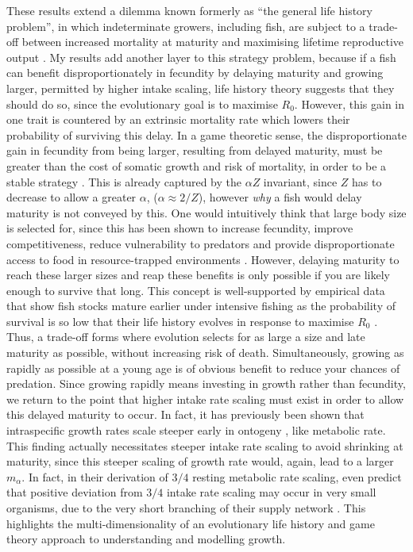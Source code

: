 \documentclass[a4paper]{article} %
\begin{document}
These results extend a dilemma known formerly as ``the general life history problem'', in which indeterminate growers, including fish, are subject to a trade-off between increased mortality at maturity and maximising lifetime reproductive output \autocite{Roff1984, Roff2006, Stearns2000}. My results add another layer to this strategy problem, because if a fish can benefit disproportionately in fecundity by delaying maturity and growing larger, permitted by higher intake scaling, life history theory suggests that they should do so, since the evolutionary goal is to maximise $R_0$. However, this gain in one trait is countered by an extrinsic mortality rate which lowers their probability of surviving this delay. In a game theoretic sense, the disproportionate gain in fecundity from being larger, resulting from delayed maturity, must be greater than the cost of somatic growth and risk of mortality, in order to be a stable strategy \autocite{Arendt2011, Enberg2012}. This is already captured by the $\alpha Z$ invariant, since $Z$ has to decrease to allow a greater $\alpha$, ($\alpha \approx 2/Z$), however \textit{why} a fish would delay maturity is not conveyed by this. One would intuitively think that large body size is selected for, since this has been shown to increase fecundity, improve competitiveness, reduce vulnerability to predators and provide disproportionate access to food in resource-trapped environments \autocite{roff2002life, Oddie2000, French2005, Bashey2008, Magnhagen2001, Craig2006, Arendt2011, Pawar2012}. However, delaying maturity to reach these larger sizes and reap these benefits is only possible if you are likely enough to survive that long. This concept is well-supported by empirical data that show fish stocks mature earlier under intensive fishing as the probability of survival is so low that their life history evolves in response to maximise $R_0$ \autocite{Rowell1993, Rochet2001, Swain2011}. Thus, a trade-off forms where evolution selects for as large a size and late maturity as possible, without increasing risk of death. Simultaneously, growing as rapidly as possible at a young age is of obvious benefit to reduce your chances of predation. Since growing rapidly means investing in growth rather than fecundity, we return to the point that higher intake rate scaling must exist in order to allow this delayed maturity to occur. In fact, it has previously been shown that intraspecific growth rates scale steeper early in ontogeny \autocite{Barneche2018c}, like metabolic rate. This finding actually necessitates steeper intake rate scaling to avoid shrinking at maturity, since this steeper scaling of growth rate would, again, lead to a larger $m_{\alpha}$. In fact, in their derivation of $3/4$ resting metabolic rate scaling, \textcite{West1997} even predict that positive deviation from $3/4$ intake rate scaling may occur in very small organisms, due to the very short branching of their supply network \autocite{Barneche2018c}. This highlights the multi-dimensionality of an evolutionary life history and game theory approach to understanding and modelling growth. 
\end{document}
